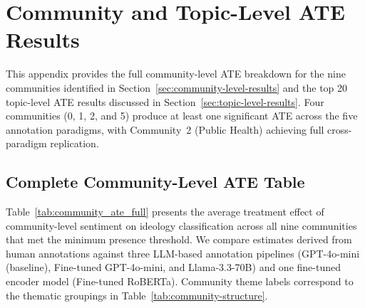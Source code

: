 \chapter{Community and Topic-Level ATE Results}
\label{sec:appendix-community-ate}

This appendix provides the full community-level ATE breakdown for the nine communities identified in Section~\ref{sec:community-level-results} and the top 20 topic-level ATE results discussed in Section~\ref{sec:topic-level-results}. Four communities (0, 1, 2, and 5) produce at least one significant ATE across the five annotation paradigms, with Community~2 (Public Health) achieving full cross-paradigm replication.

\section{Complete Community-Level ATE Table}

Table~\ref{tab:community_ate_full} presents the average treatment effect of community-level sentiment on ideology classification across all nine communities that met the minimum presence threshold. We compare estimates derived from human annotations against three LLM-based annotation pipelines (GPT-4o-mini (baseline), Fine-tuned GPT-4o-mini, and Llama-3.3-70B) and one fine-tuned encoder model (Fine-tuned RoBERTa). Community theme labels correspond to the thematic groupings in Table~\ref{tab:community-structure}.

